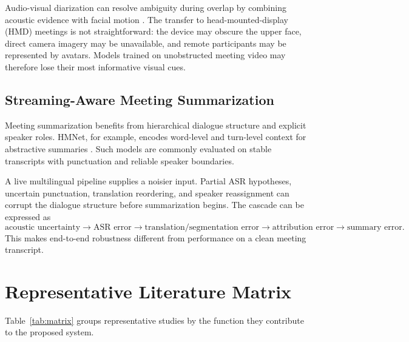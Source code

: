 \documentclass[conference]{IEEEtran}
\begin{document}
Audio-visual diarization can resolve ambiguity during overlap by combining acoustic evidence with facial motion \cite{chung2019whosaid,casa2025}. The transfer to head-mounted-display (HMD) meetings is not straightforward: the device may obscure the upper face, direct camera imagery may be unavailable, and remote participants may be represented by avatars. Models trained on unobstructed meeting video may therefore lose their most informative visual cues.

\subsection{Streaming-Aware Meeting Summarization}
Meeting summarization benefits from hierarchical dialogue structure and explicit speaker roles. HMNet, for example, encodes word-level and turn-level context for abstractive summaries \cite{zhu2020hmnet}. Such models are commonly evaluated on stable transcripts with punctuation and reliable speaker boundaries.

A live multilingual pipeline supplies a noisier input. Partial ASR hypotheses, uncertain punctuation, translation reordering, and speaker reassignment can corrupt the dialogue structure before summarization begins. The cascade can be expressed as
\begin{equation}
\text{acoustic uncertainty} \rightarrow \text{ASR error} \rightarrow \text{translation/segmentation error}
\rightarrow \text{attribution error} \rightarrow \text{summary error}.
\end{equation}
This makes end-to-end robustness different from performance on a clean meeting transcript.

\section{Representative Literature Matrix}
Table~\ref{tab:matrix} groups representative studies by the function they contribute to the proposed system.
\end{document}
